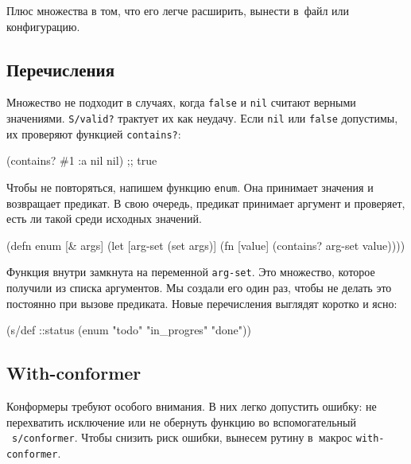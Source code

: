 \fi

Плюс множества в том, что его легче расширить, вынести в~файл или конфигурацию.

\subsection{Перечисления}


Множество не подходит в случаях, когда \verb|false| и \verb|nil| считают
верными значениями. \verb|S/valid?| трактует их как неудачу. Если \verb|nil|
или \verb|false| допустимы, их проверяют функцией \verb|contains?|:

\begin{english}
  \begin{clojure}
(contains? #{1 :a nil} nil) ;; true
  \end{clojure}
\end{english}

Чтобы не повторяться, напишем функцию \verb|enum|. Она принимает значения и
возвращает предикат. В свою очередь, предикат принимает аргумент и проверяет,
есть ли такой среди исходных значений.

\begin{english}
  \begin{clojure}
(defn enum [& args]
  (let [arg-set (set args)]
    (fn [value]
      (contains? arg-set value))))
  \end{clojure}
\end{english}

Функция внутри замкнута на переменной \verb|arg-set|. Это множество, которое
получили из списка аргументов. Мы создали его один раз, чтобы не делать это
постоянно при вызове предиката. Новые перечисления выглядят коротко и ясно:

\begin{english}
  \begin{clojure}
(s/def ::status
  (enum "todo"
        "in_progres"
        "done"))
  \end{clojure}
\end{english}

\subsection{With-conformer}


Конформеры требуют особого внимания. В них легко допустить ошибку: не
перехватить исключение или не обернуть функцию во вспомогательный
~\verb|s/conformer|. Чтобы снизить риск ошибки, вынесем рутину в~макрос
\verb|with-conformer|.

